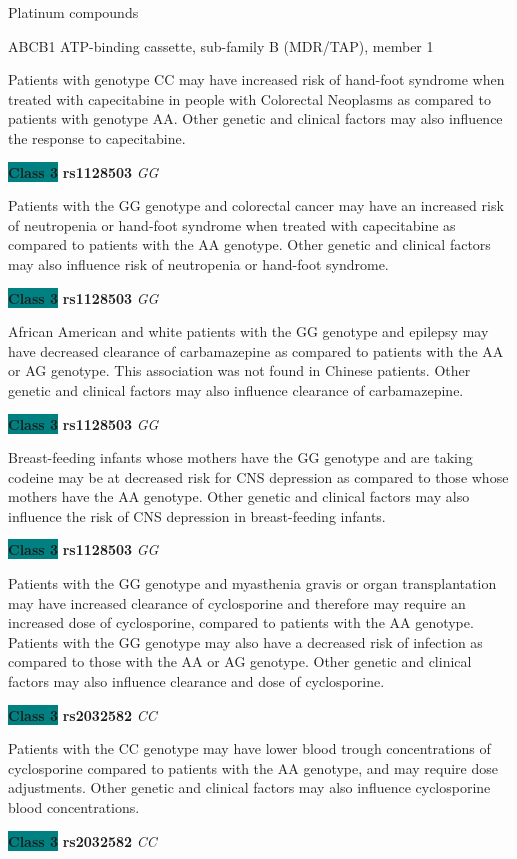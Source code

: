 \documentclass{resume} %
\begin{document}
\begin{rSection}{ Platinum compounds }
\begin{rSubsection}{ ABCB1 }{ ATP-binding cassette, sub-family B (MDR/TAP), member 1 }{}{}
\item[] Patients with genotype CC may have increased risk of hand-foot syndrome when treated with capecitabine in people with Colorectal Neoplasms as compared to patients with genotype AA. Other genetic and clinical factors may also influence the response to capecitabine.\item \textbf{\colorbox{teal} {Class 3}} \textbf{ rs1128503 } \textit{ GG }
\item[] Patients with the GG genotype and colorectal cancer may have an increased risk of neutropenia or hand-foot syndrome when treated with capecitabine as compared to patients with the AA genotype. Other genetic and clinical factors may also influence risk of neutropenia or hand-foot syndrome.\item \textbf{\colorbox{teal} {Class 3}} \textbf{ rs1128503 } \textit{ GG }
\item[] African American and white patients with the GG genotype and epilepsy may have decreased clearance of carbamazepine as compared to patients with the AA or AG genotype. This association was not found in Chinese patients. Other genetic and clinical factors may also influence clearance of carbamazepine.\item \textbf{\colorbox{teal} {Class 3}} \textbf{ rs1128503 } \textit{ GG }
\item[] Breast-feeding infants whose mothers have the GG genotype and are taking codeine may be at decreased risk for CNS depression as compared to those whose mothers have the AA genotype. Other genetic and clinical factors may also influence the risk of CNS depression in breast-feeding infants. \item \textbf{\colorbox{teal} {Class 3}} \textbf{ rs1128503 } \textit{ GG }
\item[] Patients with the GG genotype and myasthenia gravis or organ transplantation may have increased clearance of cyclosporine and therefore may require an increased dose of cyclosporine, compared to patients with the AA genotype. Patients with the GG genotype may also have a decreased risk of infection as compared to those with the AA or AG genotype. Other genetic and clinical factors may also influence clearance and dose of cyclosporine.\item \textbf{\colorbox{teal} {Class 3}} \textbf{ rs2032582 } \textit{ CC }
\item[] Patients with the CC genotype may have lower blood trough concentrations of cyclosporine compared to patients with the AA genotype, and may require dose adjustments. Other genetic and clinical factors may also influence cyclosporine blood concentrations.\item \textbf{\colorbox{teal} {Class 3}} \textbf{ rs2032582 } \textit{ CC }

\end{rSubsection}
\end{rSection}
\end{document}
